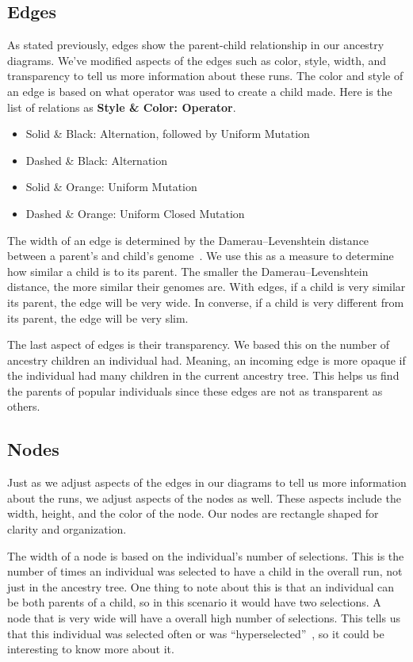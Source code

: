 \documentclass{sig-alternate}
\begin{document}
\subsection{Edges}
\label{sec:edges}

As stated previously, edges show the parent-child relationship in our ancestry diagrams. We've modified aspects of the edges such as color, style, width, and transparency to tell us more information about these runs. The color and style of an edge is based on what operator was used to create a child made. Here is the list of relations as \textbf{Style \& Color: Operator}.
\begin{itemize}
\setlength\itemsep{0em}
\item Solid \& Black: Alternation, followed by Uniform Mutation
\item Dashed \& Black: Alternation
\item Solid \& Orange: Uniform Mutation
\item Dashed \& Orange: Uniform Closed Mutation
\end{itemize}

The width of an edge is determined by the Damerau--Levenshtein distance between a parent's and child's genome~\cite{wiki:DLdist}. We use this as a measure to determine how similar a child is to its parent. The smaller the Damerau--Levenshtein distance, the more similar their genomes are. With edges, if a child is very similar its parent, the edge will be very wide. In converse, if a child is very different from its parent, the edge will be very slim.

The last aspect of edges is their transparency. We based this on the number of ancestry children an individual had. Meaning, an incoming edge is more opaque if the individual had many children in the current ancestry tree. This helps us find the parents of popular individuals since these edges are not as transparent as others.

\subsection{Nodes}
\label{sec:nodes}

Just as we adjust aspects of the edges in our diagrams to tell us more information about the runs, we adjust aspects of the nodes as well. These aspects include the width, height, and the color of the node. Our nodes are rectangle shaped for clarity and organization. 

The width of a node is based on the individual's number of selections. This is the number of times an individual was selected to have a child in the overall run, not just in the ancestry tree. One thing to note about this is that an individual can be both parents of a child, so in this scenario it would have two selections. A node that is very wide will have a overall high number of selections. This tells us that this individual was selected often or was ``hyperselected''~\cite{Helmuth:2016:GECCO}, so it could be interesting to know more about it. 
\end{document}
